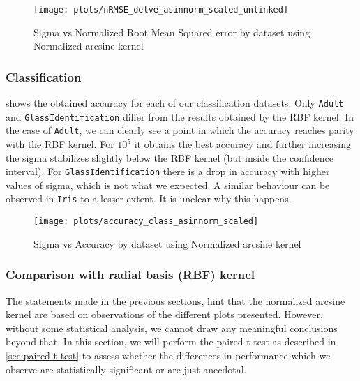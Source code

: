 
\begin{figure}[H]
    \texttt{[image: plots/nRMSE\_delve\_asinnorm\_scaled\_unlinked]}
    \caption{Sigma vs Normalized Root Mean Squared error by dataset using Normalized arcsine kernel}%
    \label{fig:nrmse-delve-asinnorm-scaled}
\end{figure}

\subsubsection{Classification}

 shows the obtained accuracy for each
of our classification datasets. Only \texttt{Adult} and \texttt{GlassIdentification}
differ from the results obtained by the RBF kernel. In the case of \texttt{Adult},
we can clearly see a point in which the accuracy reaches parity with the RBF
kernel. For $10^5$ it obtains the best accuracy and further increasing the sigma
stabilizes slightly below the RBF kernel (but inside the confidence interval). For
\texttt{GlassIdentification} there is a drop in accuracy with higher values of
sigma, which is not what we expected. A similar behaviour can be observed in
\texttt{Iris} to a lesser extent. It is unclear why this happens.


\begin{figure}[H]
    \texttt{[image: plots/accuracy\_class\_asinnorm\_scaled]}
    \caption{Sigma vs Accuracy by dataset using Normalized arcsine kernel}%
    \label{fig:accuracy-asinnorm-scaled}
\end{figure}

\subsubsection{Comparison with radial basis (RBF) kernel}

The statements made in the previous sections, hint that the normalized arcsine
kernel are based on observations of the different plots presented. However,
without some statistical analysis, we cannot draw any meaningful conclusions
beyond that. In this section, we will perform the paired t-test as described in
\cref{sec:paired-t-test} to assess whether the differences in performance which
we observe are statistically significant or are just anecdotal.


